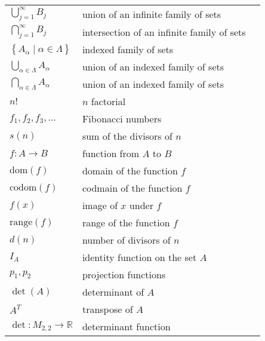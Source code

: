 \begin{tabular}{p{1in} p{2.5in} l}
$\bigcup\limits_{j=1}^{\infty}B_j$ & union of an infinite family of sets & \pageref{sym:unioninfiniteindex} \\
$\bigcap\limits_{j=1}^{\infty}B_j$ & intersection of an infinite family of sets & \pageref{sym:unioninfiniteindex} \\
$\left\{ A_\alpha \mid \alpha \in \Lambda \right\}$ & indexed family of sets & \pageref{sym:indexfamily} \\
$\bigcup\limits_{\alpha \in \Lambda}^{}A_\alpha $ & union of an indexed family of sets & \pageref{sym:unionindex} \\
$\bigcap\limits_{\alpha \in \Lambda}^{}A_\alpha $ & union of an indexed family of sets & \pageref{sym:interindex} \\
$n!$           &  $n$ factorial       &  \pageref{sym:factorial} \\
$f_1, f_2, f_3, \ldots $  &  Fibonacci numbers  &  \pageref{sym:fibonacci}  \\
$s ( n )$  &  sum of the divisors of $n$  &  \pageref{sym:sumdivisors}  \\
$f:A \to B$          &  function from $A$ to $B$     &  \pageref{sym:function}  \\
$\text{dom}( f )$  &  domain of the function $f$   &  \pageref{sym:domfunc}  \\
$\text{codom}( f )$  & codmain of the function $f$  &  \pageref{sym:codomain}  \\
$f( x )$   &  image of $x$ under $f$   &  \pageref{sym:fofx}  \\
$\text{range}( f )$  &  range of the function $f$   &  \pageref{sym:rangef}  \\
$d( n )$   &  number of divisors of $n$  &  \pageref{sym:numdivisors}  \\
$I_A$                 &  identity function on the set $A$  &  \pageref{sym:idfunc} \\
$p_1, p_2$            &  projection functions                 &  \pageref{sym:projfunc}  \\
$\det ( A )$ &  determinant of $A$           &  \pageref{sym:determinant}  \\
$A^T $               &  transpose of $A$                &  \pageref{sym:transpose}  \\
$\det :M_{2, 2}  \to \mathbb{R}$  &  determinant function  &  \pageref{sym:detfunc}  \\
\end{tabular}

